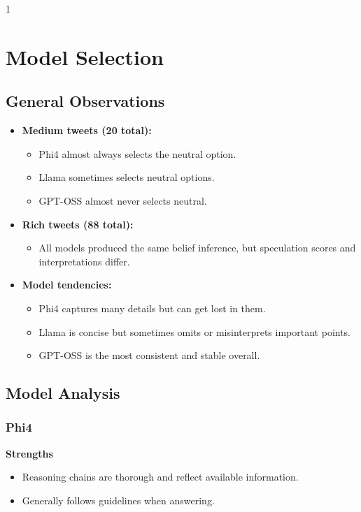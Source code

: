 \begin{spacing}{1}
\section{Model Selection}
\subsection{General Observations}
\begin{itemize}
    \item \textbf{Medium tweets (20 total):}
    \begin{itemize}
        \item Phi4 almost always selects the neutral option.
        \item Llama sometimes selects neutral options.
        \item GPT-OSS almost never selects neutral.
    \end{itemize}
    
    \item \textbf{Rich tweets (88 total):}
    \begin{itemize}
        \item All models produced the same belief inference, but speculation scores and interpretations differ.
    \end{itemize}
    
    \item \textbf{Model tendencies:}
    \begin{itemize}
        \item Phi4 captures many details but can get lost in them.
        \item Llama is concise but sometimes omits or misinterprets important points.
        \item GPT-OSS is the most consistent and stable overall.
    \end{itemize}
\end{itemize}

\subsection{Model Analysis}

\subsubsection{Phi4}
\textbf{Strengths}
\begin{itemize}
    \item Reasoning chains are thorough and reflect available information.
    \item Generally follows guidelines when answering.
\end{itemize}


\end{spacing}
